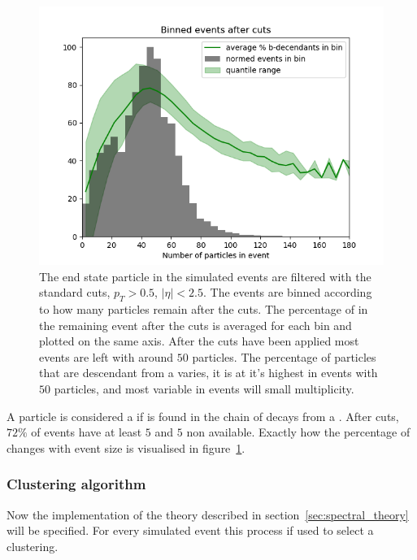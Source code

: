 \begin{figure}[htp]
    \begin{minipage}[c]{0.5\textwidth}
        \includegraphics[width=1\textwidth]{graphics/binned_events.png}
    \end{minipage}\hfill
    \begin{minipage}[c]{0.45\textwidth}
        \caption{The end state particle in the simulated events are filtered
            with the standard cuts, \(p_T > 0.5\), \(|\eta| < 2.5\).
            The events are binned according to how many particles remain after the cuts.
            The percentage of  in the remaining event after the cuts
            is averaged for each bin and plotted on the same axis.
            After the cuts have been applied most events are left with around \(50\) particles.
                 The percentage of particles that are descendant from a  varies,
                 it is at it's highest in events with \(50\) particles,
             and most variable in events will small multiplicity.}\label{fig:bdecendantpercent}
    \end{minipage}
\end{figure}    

A particle is considered a  if is found in the chain of decays from a .
After cuts, \(72\%\) of events have at least \(5\)  and \(5\) non  available.
Exactly how the percentage of  changes with event size is visualised in figure~\ref{fig:bdecendantpercent}.

\subsubsection{Clustering algorithm}\label{sec:spectralmethodalgo}
Now the implementation of the theory described in section~\ref{sec:spectral_theory} will be specified.
For every simulated event this process if used to select a clustering.

